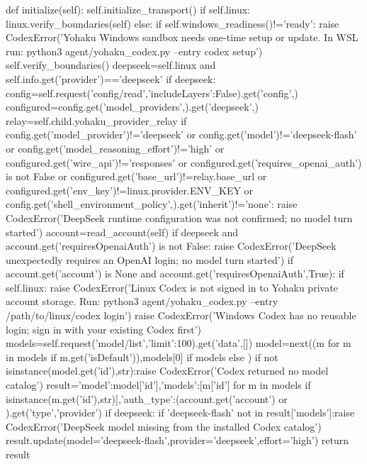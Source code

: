     def initialize(self):
        self.initialize_transport()
        if self.linux:
            linux.verify_boundaries(self)
        else:
            if self.windows_readiness()!='ready':
                raise CodexError('Yohaku Windows sandbox needs one-time setup or update. In WSL run: python3 agent/yohaku_codex.py --entry codex setup')
            self.verify_boundaries()
        deepseek=self.linux and self.info.get('provider')=='deepseek'
        if deepseek:
            config=self.request('config/read',{'includeLayers':False}).get('config',{})
            configured=config.get('model_providers',{}).get('deepseek',{})
            relay=self.child.yohaku_provider_relay
            if config.get('model_provider')!='deepseek' or config.get('model')!='deepseek-flash' or config.get('model_reasoning_effort')!='high' or configured.get('wire_api')!='responses' or configured.get('requires_openai_auth') is not False or configured.get('base_url')!=relay.base_url or configured.get('env_key')!=linux.provider.ENV_KEY or config.get('shell_environment_policy',{}).get('inherit')!='none':
                raise CodexError('DeepSeek runtime configuration was not confirmed; no model turn started')
        account=read_account(self)
        if deepseek and account.get('requiresOpenaiAuth') is not False:
            raise CodexError('DeepSeek unexpectedly requires an OpenAI login; no model turn started')
        if account.get('account') is None and account.get('requiresOpenaiAuth',True):
            if self.linux:
                raise CodexError('Linux Codex is not signed in to Yohaku private account storage. Run: python3 agent/yohaku_codex.py --entry /path/to/linux/codex login')
            raise CodexError('Windows Codex has no reusable login; sign in with your existing Codex first')
        models=self.request('model/list',{'limit':100}).get('data',[])
        model=next((m for m in models if m.get('isDefault')),models[0] if models else {})
        if not isinstance(model.get('id'),str):raise CodexError('Codex returned no model catalog')
        result={'model':model['id'],'models':[m['id'] for m in models if isinstance(m.get('id'),str)],'auth_type':(account.get('account') or {}).get('type','provider')}
        if deepseek:
            if 'deepseek-flash' not in result['models']:raise CodexError('DeepSeek model missing from the installed Codex catalog')
            result.update(model='deepseek-flash',provider='deepseek',effort='high')
        return result

